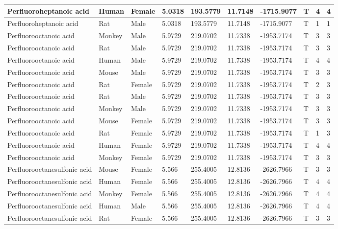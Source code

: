 \begin{table}[H]
{\begin{tabular}{|l|l|l|l|l|l|l|l|l|l|}
Perfluoroheptanoic   acid & Human & Female & 5.0318 & 193.5779 & 11.7148 & -1715.9077 & T & 4 & 4 \\ \hline
Perfluoroheptanoic   acid & Rat & Male & 5.0318 & 193.5779 & 11.7148 & -1715.9077 & T & 1 & 1 \\ \hline
Perfluorooctanoic   acid & Monkey & Male & 5.9729 & 219.0702 & 11.7338 & -1953.7174 & T & 3 & 3 \\ \hline
Perfluorooctanoic   acid & Rat & Male & 5.9729 & 219.0702 & 11.7338 & -1953.7174 & T & 3 & 3 \\ \hline
Perfluorooctanoic   acid & Human & Male & 5.9729 & 219.0702 & 11.7338 & -1953.7174 & T & 4 & 4 \\ \hline
Perfluorooctanoic   acid & Mouse & Male & 5.9729 & 219.0702 & 11.7338 & -1953.7174 & T & 3 & 3 \\ \hline
\rowcolor[HTML]{DAE9F8} 
Perfluorooctanoic   acid & Rat & Female & 5.9729 & 219.0702 & 11.7338 & -1953.7174 & T & 2 & 3 \\ \hline
Perfluorooctanoic   acid & Rat & Male & 5.9729 & 219.0702 & 11.7338 & -1953.7174 & T & 3 & 3 \\ \hline
Perfluorooctanoic   acid & Monkey & Male & 5.9729 & 219.0702 & 11.7338 & -1953.7174 & T & 3 & 3 \\ \hline
Perfluorooctanoic   acid & Mouse & Female & 5.9729 & 219.0702 & 11.7338 & -1953.7174 & T & 3 & 3 \\ \hline
\rowcolor[HTML]{DAE9F8} 
Perfluorooctanoic   acid & Rat & Female & 5.9729 & 219.0702 & 11.7338 & -1953.7174 & T & 1 & 3 \\ \hline
Perfluorooctanoic   acid & Human & Female & 5.9729 & 219.0702 & 11.7338 & -1953.7174 & T & 4 & 4 \\ \hline
Perfluorooctanoic   acid & Monkey & Female & 5.9729 & 219.0702 & 11.7338 & -1953.7174 & T & 3 & 3 \\ \hline
Perfluorooctanesulfonic   acid & Mouse & Female & 5.566 & 255.4005 & 12.8136 & -2626.7966 & T & 3 & 3 \\ \hline
Perfluorooctanesulfonic   acid & Human & Female & 5.566 & 255.4005 & 12.8136 & -2626.7966 & T & 4 & 4 \\ \hline
Perfluorooctanesulfonic   acid & Monkey & Female & 5.566 & 255.4005 & 12.8136 & -2626.7966 & T & 4 & 4 \\ \hline
Perfluorooctanesulfonic   acid & Human & Male & 5.566 & 255.4005 & 12.8136 & -2626.7966 & T & 4 & 4 \\ \hline
Perfluorooctanesulfonic   acid & Rat & Female & 5.566 & 255.4005 & 12.8136 & -2626.7966 & T & 3 & 3 \\ \hline

\end{tabular}}
\end{table}
